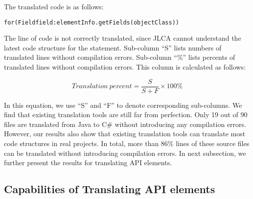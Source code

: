The translated code is as follows:

\begin{CodeOut}%
\begin{alltt}
for(Field field: elementInfo.getFields(objectClass))
\end{alltt}
\end{CodeOut}

The line of code is not correctly translated, since JLCA cannot understand the latest code structure for the  statement. Sub-column ``S'' lists numbers of translated lines without compilation errors. Sub-column ``\%'' lists percents of translated lines without compilation errors. This column is calculated as follows:

\begin{equation}\label{eq-correctpercent}
Translation\ percent=\frac{S}{S+F}\times 100\%
\end{equation}%

In this equation, we use ``S'' and ``F'' to denote corresponding sub-columns. We find that existing translation tools are still far from perfection. Only 19 out of 90 files are translated from Java to C\# without introducing any compilation errors. However, our results also show that existing translation tools can translate most code structures in real projects. In total, more than 86\% lines of these source files can be translated without introducing compilation errors. In next subsection, we further present the results for translating API elements.

\subsection{Capabilities of Translating API elements}
\label{sec:real:api}

